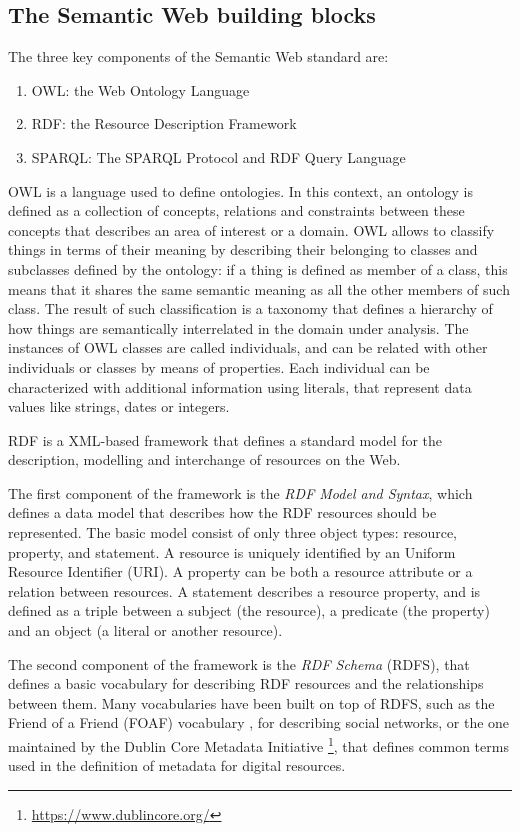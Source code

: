 \documentclass[%
    corpo=13.5pt,
    twoside,
    oldstyle,
    tipotesi=magistrale,
    greek,
    evenboxes
]{toptesi}
\begin{document}
\subsection{The Semantic Web building blocks}

The three key components of the Semantic Web standard are:
\begin{enumerate}
\item OWL: the Web Ontology Language
\item RDF: the Resource Description Framework
\item SPARQL: The SPARQL Protocol and RDF Query Language
\end{enumerate}
\bigskip

OWL is a language used to define ontologies. In this context, an ontology
is defined as a collection of concepts, relations and constraints between
these concepts that describes an area of interest or a domain.
OWL allows to classify things in terms of their meaning by describing
their belonging to classes and subclasses defined by the ontology: if
a thing is defined as member of a class, this means that it shares the
same semantic meaning as all the other members of such class. The result of
such classification is a taxonomy that defines a hierarchy of how things
are semantically interrelated in the domain under analysis.
The instances of OWL classes are called individuals, and can be related
with other individuals or classes by means of properties. Each individual
can be characterized with additional information using literals, that
represent data values like strings, dates or integers.
\newline

RDF is a XML-based framework that defines a standard model for the
description, modelling and interchange of resources on the Web.

The first component of the framework is the \emph{RDF Model and Syntax},
which defines a data model that describes how the RDF resources should be
represented. The basic model consist of only three object types: resource,
property, and statement.
A resource is uniquely identified by an Uniform Resource Identifier (URI).
A property can be both a resource attribute or a relation between resources.
A statement describes a resource property, and is defined as a triple
between a subject (the resource), a predicate (the property) and an
object (a literal or another resource).

The second component of the framework is the \emph{RDF Schema} (RDFS),
that defines a basic vocabulary for describing RDF resources and the
relationships between them. Many vocabularies have been built on top of
RDFS, such as the Friend of a Friend (FOAF) vocabulary \cite{brickley2007}, for
describing social networks, or the one maintained by the Dublin Core Metadata
Initiative \footnote{\url{https://www.dublincore.org/}}, that defines common
terms used in the definition of metadata for digital resources.
\end{document}
